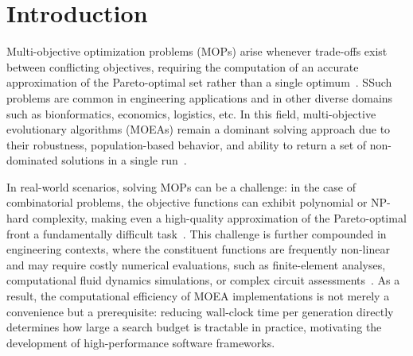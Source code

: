 \documentclass[final,5p,times,twocolumn]{elsarticle}
\begin{document}
\section{Introduction} \label{sec:intro}

Multi-objective optimization problems (MOPs) arise whenever trade-offs exist between conflicting objectives, requiring the computation of an accurate approximation of the Pareto-optimal set rather than a single optimum~\cite{deb01}. SSuch problems are common in engineering applications and in other diverse domains such as bionformatics, economics, logistics, etc. In this field, multi-objective evolutionary algorithms (MOEAs) remain a dominant solving approach due to their robustness, population-based behavior, and ability to return a set of non-dominated solutions in a single run~\cite{CLV07}.

In real-world scenarios, solving MOPs can be a challenge: in the case of combinatorial problems, the objective functions can exhibit polynomial or NP-hard complexity, making even a high-quality approximation of the Pareto-optimal front a fundamentally difficult task~\cite{CLV07,deb01}. This challenge is further compounded in engineering contexts, where the constituent functions are frequently non-linear and may require costly numerical evaluations, such as finite-element analyses, computational fluid dynamics simulations, or complex circuit assessments~\cite{ZGM23}. As a result, the computational efficiency of MOEA implementations is not merely a convenience but a prerequisite: reducing wall-clock time per generation directly determines how large a search budget is tractable in practice, motivating the development of high-performance software frameworks.
\end{document}

